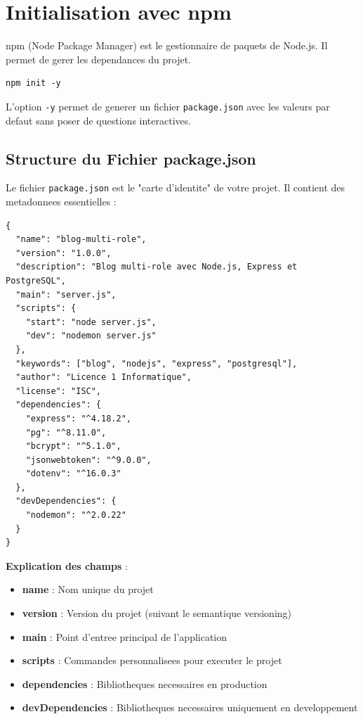 \documentclass[a4paper,12pt]{book}
\begin{document}
\section{Initialisation avec npm}

npm (Node Package Manager) est le gestionnaire de paquets de Node.js. Il permet de gerer les dependances du projet.

\begin{lstlisting}[style=bash, caption=Initialisation du projet avec npm]
npm init -y
\end{lstlisting}

L'option \texttt{-y} permet de generer un fichier \texttt{package.json} avec les valeurs par defaut sans poser de questions interactives.

\subsection{Structure du Fichier package.json}

Le fichier \texttt{package.json} est le "carte d'identite" de votre projet. Il contient des metadonnees essentielles :

\begin{lstlisting}[style=javascript, caption=Exemple de package.json]
{
  "name": "blog-multi-role",
  "version": "1.0.0",
  "description": "Blog multi-role avec Node.js, Express et PostgreSQL",
  "main": "server.js",
  "scripts": {
    "start": "node server.js",
    "dev": "nodemon server.js"
  },
  "keywords": ["blog", "nodejs", "express", "postgresql"],
  "author": "Licence 1 Informatique",
  "license": "ISC",
  "dependencies": {
    "express": "^4.18.2",
    "pg": "^8.11.0",
    "bcrypt": "^5.1.0",
    "jsonwebtoken": "^9.0.0",
    "dotenv": "^16.0.3"
  },
  "devDependencies": {
    "nodemon": "^2.0.22"
  }
}
\end{lstlisting}

\begin{definitionbox}
    \textbf{Explication des champs} :
    \begin{itemize}
        \item \textbf{name} : Nom unique du projet
        \item \textbf{version} : Version du projet (suivant le semantique versioning)
        \item \textbf{main} : Point d'entree principal de l'application
        \item \textbf{scripts} : Commandes personnalisees pour executer le projet
        \item \textbf{dependencies} : Bibliotheques necessaires en production
        \item \textbf{devDependencies} : Bibliotheques necessaires uniquement en developpement
    \end{itemize}
\end{definitionbox}
\end{document}
